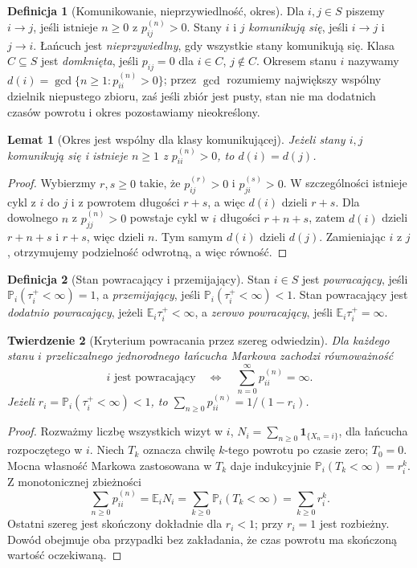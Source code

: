 \documentclass[11pt,a4paper,oneside]{report}
\numberwithin{equation}{chapter}
\theoremstyle{plain}
\newtheorem{twierdzenie}{Twierdzenie}[chapter]
\newtheorem{lemat}[twierdzenie]{Lemat}
\theoremstyle{definition}
\newtheorem{definicja}{Definicja}[chapter]
\theoremstyle{remark}
\newcommand{\Prob}{\mathbb{P}}
\newcommand{\E}{\mathbb{E}}
\newcommand{\ind}[1]{\mathbf{1}_{#1}}
\begin{document}
\begin{definicja}[Komunikowanie, nieprzywiedlność, okres]
Dla $i,j\in S$ piszemy $i\to j$, jeśli istnieje
$n\geq0$ z $p_{ij}^{(n)}>0$. Stany $i$ i $j$
\emph{komunikują się}, jeśli $i\to j$ i $j\to i$.
Łańcuch jest \emph{nieprzywiedlny}, gdy wszystkie
stany komunikują się. Klasa $C\subseteq S$
jest \emph{domknięta}, jeśli $p_{ij}=0$ dla
$i\in C$, $j\notin C$. Okresem stanu $i$ nazywamy
$d(i)=\gcd\{n\geq1:p_{ii}^{(n)}>0\}$;
przez $\gcd$ rozumiemy największy wspólny dzielnik
niepustego zbioru, zaś jeśli zbiór jest pusty,
stan nie ma dodatnich czasów powrotu i okres
pozostawiamy nieokreślony.
\end{definicja}

\begin{lemat}[Okres jest wspólny dla klasy komunikującej]
Jeżeli stany $i,j$ komunikują się i istnieje
$n\geq1$ z $p_{ii}^{(n)}>0$, to $d(i)=d(j)$.
\end{lemat}
\begin{proof}
Wybierzmy $r,s\geq0$ takie, że
$p_{ij}^{(r)}>0$ i $p_{ji}^{(s)}>0$.
W szczególności istnieje cykl z $i$ do $j$ i z
powrotem długości $r+s$, a więc $d(i)$ dzieli $r+s$.
Dla dowolnego $n$ z $p_{jj}^{(n)}>0$ powstaje
cykl w $i$ długości $r+n+s$, zatem $d(i)$
dzieli $r+n+s$ i $r+s$, więc dzieli $n$.
Tym samym $d(i)$ dzieli $d(j)$.
Zamieniając $i$ z $j$, otrzymujemy podzielność
odwrotną, a więc równość.
\end{proof}

\begin{definicja}[Stan powracający i przemijający]
Stan $i\in S$ jest \emph{powracający}, jeśli
$\Prob_i(\tau_i^+<\infty)=1$, a
\emph{przemijający}, jeśli
$\Prob_i(\tau_i^+<\infty)<1$.
Stan powracający jest \emph{dodatnio powracający},
jeżeli $\E_i\tau_i^+<\infty$, a \emph{zerowo
powracający}, jeśli $\E_i\tau_i^+=\infty$.
\end{definicja}

\begin{twierdzenie}[Kryterium powracania przez szereg odwiedzin]
Dla każdego stanu $i$ przeliczalnego jednorodnego
łańcucha Markowa zachodzi równoważność
\[
 i\text{ jest powracający}\quad\Longleftrightarrow
\quad\sum_{n=0}^{\infty}p_{ii}^{(n)}=\infty.
\]
Jeżeli $r_i=\Prob_i(\tau_i^+<\infty)<1$,
to $\sum_{n\geq0}p_{ii}^{(n)}=1/(1-r_i)$.
\end{twierdzenie}
\begin{proof}
Rozważmy liczbę wszystkich wizyt w $i$,
$N_i=\sum_{n\geq0}\ind{\{X_n=i\}}$, dla łańcucha
rozpoczętego w $i$. Niech $T_k$ oznacza chwilę
$k$-tego powrotu po czasie zero; $T_0=0$.
Mocna własność Markowa zastosowana w $T_k$
daje indukcyjnie
$\Prob_i(T_k<\infty)=r_i^k$.
Z monotonicznej zbieżności
\[
\sum_{n\geq0}p_{ii}^{(n)}=\E_iN_i
=\sum_{k\geq0}\Prob_i(T_k<\infty)
=\sum_{k\geq0}r_i^k.
\]
Ostatni szereg jest skończony dokładnie dla $r_i<1$;
przy $r_i=1$ jest rozbieżny. Dowód obejmuje oba
przypadki bez zakładania, że czas powrotu ma
skończoną wartość oczekiwaną.
\end{proof}
\end{document}
